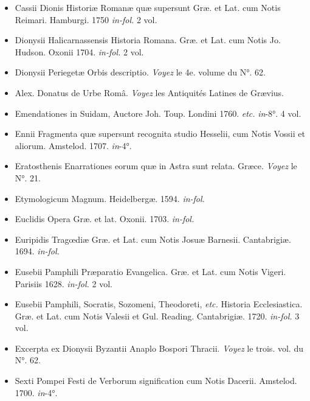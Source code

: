 \documentclass[a4paper, 11pt, oneside, polutonikogreek, french]{article}
\begin{document}
\begin{itemize}
    \item Cassii Dionis Historiæ Romanæ quæ supersunt Græ. et Lat. cum Notis Reimari. Hamburgi. 1750 \emph{in-fol.} 2 vol.

    \item Dionysii Halicarnassensis Historia Romana. Græ. et Lat. cum Notis Jo. Hudson. Oxonii 1704. \emph{in-fol.} 2 vol.

    \item Dionysii Periegetæ Orbis descriptio. \emph{Voyez} le 4e. volume du N°. 62.

    \item Alex. Donatus de Urbe Româ. \emph{Voyez} les Antiquités Latines de Grævius.

    \item Emendationes in Suidam, Auctore Joh. Toup. Londini 1760. \emph{etc.} \emph{in}-8°. 4 vol.

    \item Ennii Fragmenta quæ supersunt recognita studio Hesselii, cum Notis Vossii et aliorum. Amstelod. 1707. \emph{in}-4°.

    \item Eratosthenis Enarrationes eorum quæ in Astra sunt relata. Græce. \emph{Voyez} le N°. 21.

    \item Etymologicum Magnum. Heidelbergæ. 1594. \emph{in-fol.}

    \item Euclidis Opera Græ. et lat. Oxonii. 1703. \emph{in-fol.}

    \item Euripidis Tragœdiæ Græ. et Lat. cum Notis Josuæ Barnesii. Cantabrigiæ. 1694. \emph{in-fol.}

    \item Eusebii Pamphili Præparatio Evangelica. Græ. et Lat. cum Notis Vigeri. Parisiis 1628. \emph{in-fol.} 2 vol.

    \item Eusebii Pamphili, Socratis, Sozomeni, Theodoreti, \emph{etc.} Historia Ecclesiastica. Græ. et Lat. cum Notis Valesii et Gul. Reading. Cantabrigiæ. 1720. \emph{in-fol.} 3 vol.

    \item Excerpta ex Dionysii Byzantii Anaplo Bospori Thracii. \emph{Voyez} le trois. vol. du N°. 62.

    \item Sexti Pompei Festi de Verborum signification cum Notis Dacerii. Amstelod. 1700. \emph{in}-4°.


\end{itemize}
\end{document}
